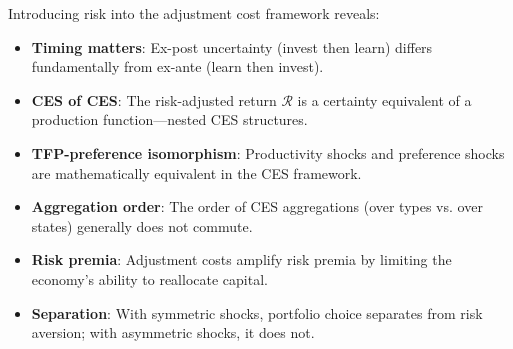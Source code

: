 \begin{callouttip}
Introducing risk into the adjustment cost framework reveals:
\begin{itemize}[nosep]
\item \textbf{Timing matters}: Ex-post uncertainty (invest then learn) differs fundamentally from ex-ante (learn then invest).
\item \textbf{CES of CES}: The risk-adjusted return $\mathcal{R}$ is a certainty equivalent of a production function---nested CES structures.
\item \textbf{TFP-preference isomorphism}: Productivity shocks and preference shocks are mathematically equivalent in the CES framework.
\item \textbf{Aggregation order}: The order of CES aggregations (over types vs. over states) generally does not commute.
\item \textbf{Risk premia}: Adjustment costs amplify risk premia by limiting the economy's ability to reallocate capital.
\item \textbf{Separation}: With symmetric shocks, portfolio choice separates from risk aversion; with asymmetric shocks, it does not.
\end{itemize}
\end{callouttip}
